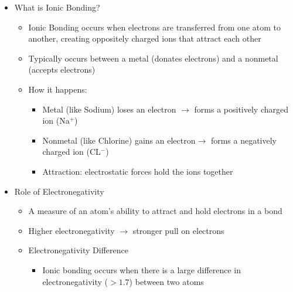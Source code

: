 \begin{itemize}

  \item What is Ionic Bonding?

    \begin{itemize}

      \item Ionic Bonding occurs when electrons are transferred from one atom to another, creating oppositely charged ions that attract each other

      \item Typically occurs between a metal (donates electrons) and a nonmetal (accepts electrons)

      \item How it happens:

        \begin{itemize}

          \item Metal (like Sodium) loses an electron $\to$ forms a positively charged ion (Na$^+$)

          \item Nonmetal (like Chlorine) gains an electron$\to$ forms a negatively charged ion (CL$^-$)

          \item Attraction: electrostatic forces hold the ions together

        \end{itemize}

    \end{itemize}

  \item Role of Electronegativity

    \begin{itemize}

      \item A measure of an atom's ability to attract and hold electrons in a bond

      \item Higher electronegativity $\to$ stronger pull on electrons

      \item Electronegativity Difference

        \begin{itemize}

          \item Ionic bonding occurs when there is a large difference in electronegativity ($>1.7$) between two atoms


\end{itemize}
\end{itemize}
\end{itemize}

